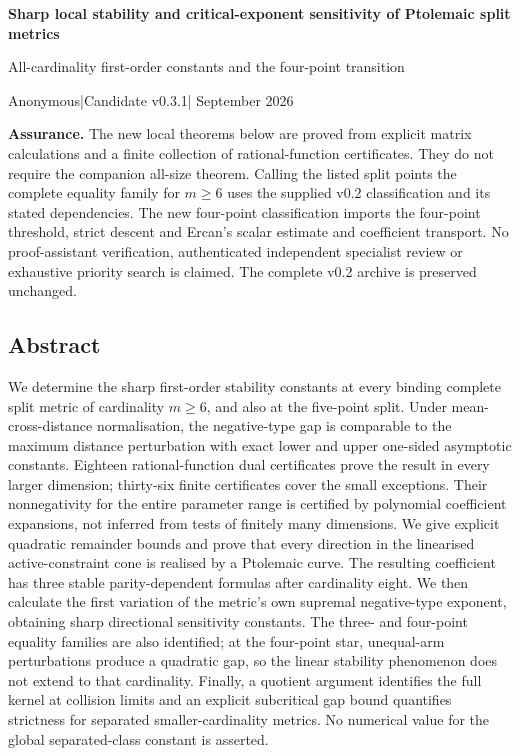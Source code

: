 \documentclass[11pt,a4paper]{article}
\begin{document}
\begin{center}
{\LARGE\bfseries Sharp local stability and critical-exponent sensitivity
of Ptolemaic split metrics\par}
\vspace{6pt}
{\large All-cardinality first-order constants and the four-point
transition\par}
\vspace{8pt}
{\small Anonymous\quad |\quad Candidate v0.3.1\quad | September 2026\par}
\end{center}
\vspace{4pt}
\textbf{Assurance.} The new local theorems below are proved from
explicit matrix calculations and a finite collection of
rational-function certificates. They do not require the companion
all-size theorem. Calling the listed split points the complete equality
family for \(m\ge6\) uses the supplied v0.2 classification and its
stated dependencies. The new four-point classification imports the
four-point threshold, strict descent and Ercan's scalar estimate and
coefficient transport. No proof-assistant verification, authenticated
independent specialist review or exhaustive priority search is claimed.
The complete v0.2 archive is preserved unchanged.

\subsection{Abstract}\label{abstract}

We determine the sharp first-order stability constants at every binding
complete split metric of cardinality \(m\ge6\), and also at the
five-point split. Under mean-cross-distance normalisation, the
negative-type gap is comparable to the maximum distance perturbation
with exact lower and upper one-sided asymptotic constants. Eighteen
rational-function dual certificates prove the result in every larger
dimension; thirty-six finite certificates cover the small exceptions.
Their nonnegativity for the entire parameter range is certified by
polynomial coefficient expansions, not inferred from tests of finitely
many dimensions. We give explicit quadratic remainder bounds and prove
that every direction in the linearised active-constraint cone is
realised by a Ptolemaic curve. The resulting coefficient has three
stable parity-dependent formulas after cardinality eight. We then
calculate the first variation of the metric's own supremal negative-type
exponent, obtaining sharp directional sensitivity constants. The three-
and four-point equality families are also identified; at the four-point
star, unequal-arm perturbations produce a quadratic gap, so the linear
stability phenomenon does not extend to that cardinality. Finally, a
quotient argument identifies the full kernel at collision limits and an
explicit subcritical gap bound quantifies strictness for separated
smaller-cardinality metrics. No numerical value for the global
separated-class constant is asserted.
\end{document}
